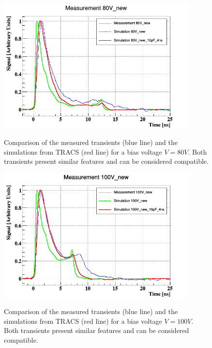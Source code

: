 \begin{figure}[H]
	\centering
	\includegraphics[width=0.9\textwidth]{80V.png}
	\label{fig:mues2}
	\caption{Comparison of the measured transients (blue line) and the simulations from TRACS (red line) for a bias voltage $V = 80V$. Both transients present similar features and can be considered compatible.}
\end{figure}


\begin{figure}[H]
	\centering
	\includegraphics[width=0.9\textwidth]{100V.png}
	\label{fig:mues2}
	\caption{Comparison of the measured transients (blue line) and the simulations from TRACS (red line) for a bias voltage $V = 100V$. Both transients present similar features and can be considered compatible.}
\end{figure}



